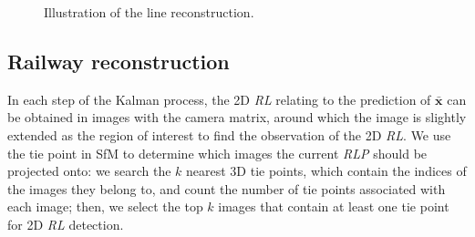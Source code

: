 \begin{figure}[htbp]
    \centering
    \hfill %
    \hfill
    \caption{Illustration of the line reconstruction.} %
    \label{fig:three-images}
\end{figure}


\subsection{Railway reconstruction}
\label{sec_linereconstruction}
In each step of the Kalman process,
the 2D \textit{RL} relating to the prediction of $\bar {\mathbf x}$ can be obtained in images with the camera matrix,
around which the image is slightly extended as the region of interest to find the observation of the 2D \textit{RL}.
We use the tie point in SfM to determine which images the current \textit{RLP} should be projected onto:
we search the $k$ nearest 3D tie points, 
which contain the indices of the images they belong to,
and count the number of tie points associated with each image;
then, 
we select the top $k$ images that contain at least one tie point for 2D \textit{RL} detection.

